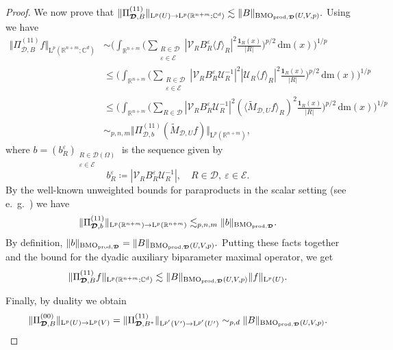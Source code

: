 \documentclass{article}
\theoremstyle{definition}
\theoremstyle{remark}
\numberwithin{equation}{section}
\newcommand{\mathdm}{\,\mathrm{dm}}
\newcommand{\cE}{\mathcal{E}}
\newcommand{\cU}{\mathcal{U}}
\newcommand{\cV}{\mathcal{V}}
\newcommand{\bfD}{\bm{\mathcal{D}}}
\newcommand{\e}{\varepsilon}
\newcommand{\reals}{\mathbb{R}}
\newcommand{\complex}{\mathbb{C}}
\newcommand{\Lp}[1]{\mathrm{L}^{#1}}
\newcommand{\1}{\mathbf{1}}
\newcommand{\BMOprodD}{\ensuremath\text{BMO}_{\text{prod},\bfD}}
\begin{document}
\begin{proof}
        We now prove that $\Vert\Pi_{\bfD,B}^{(11)}\Vert_{\Lp{p}(U)\rightarrow \Lp{p}(\reals^{n+m};\complex^d)}\lesssim\Vert B\Vert_{\BMOprodD(U,V,p)}.$ Using \cite[Lemma~5.3]{DKPS2024} we have
        \begin{align*}
            \Vert\Pi_{\bfD,B}^{(11)}f\Vert_{\Lp{p}(\reals^{n+m};\complex^d)}&\sim\bigg(\int_{\reals^{n+m}}\bigg(\sum_{\substack{R\in\bfD\\\e\in\cE}}|\cV_{R}B_{R}^{\e}\langle f\rangle_{R}|^2\frac{\1_{R}(x)}{|R|}\bigg)^{p/2}\mathdm(x)\bigg)^{1/p}\\
            &\leq\bigg(\int_{\reals^{n+m}}\bigg(\sum_{\substack{R\in\bfD\\\e\in\cE}}|\cV_{R}B_{R}^{\e}\cU_{R}^{-1}|^2|\cU_{R}\langle f\rangle_{R}|^2\frac{\1_{R}(x)}{|R|}\bigg)^{p/2}\mathdm(x)\bigg)^{1/p}\\
            &\leq\bigg(\int_{\reals^{n+m}}\bigg(\sum_{R\in\bfD}|\cV_{R}B_{R}^{\e}\cU_{R}^{-1}|^2(\langle\widetilde{M}_{\bfD,U}f\rangle_{R})^2\frac{\1_{R}(x)}{|R|}\bigg)^{p/2}\mathdm(x)\bigg)^{1/p}\\
            &\sim_{p,n,m}\Vert\Pi_{\bfD,b}^{(11)}(\widetilde{M}_{\bfD,U}f)\Vert_{\Lp{p}(\reals^{n+m})},
        \end{align*}
        where $b=(b_{R}^{\e})_{\substack{R\in\bfD(\Omega)\\\e\in\cE}}$ is the sequence given by
        \begin{equation*}
            b_{R}^{\e}\coloneq |\cV_{R}B_{R}^{\e}\cU_{R}^{-1}|,\quad R\in\bfD,~\e\in\cE.
        \end{equation*}
        By the well-known unweighted bounds for paraproducts in the scalar setting (see e.~g.~\cite{Blasco_Pott_2005}) we have
        \begin{equation*}
            \Vert\Pi_{\bfD,b}^{(11)}\Vert_{\Lp{p}(\reals^{n+m})\rightarrow \Lp{p}(\reals^{n+m})}\lesssim_{p,n,m}\Vert b\Vert_{\BMOprodD}.
        \end{equation*}
        By definition, $\Vert b\Vert_{\BMOprodD}=\Vert B\Vert_{\BMOprodD(U,V,p)}.$
        Putting these facts together and the bound for the dyadic auxiliary biparameter maximal operator, we get
        \begin{equation*}
            \Vert\Pi_{\bfD,B}^{(11)}f\Vert_{\Lp{p}(\reals^{n+m};\complex^d)} \lesssim \Vert B\Vert_{\BMOprodD(U,V,p)}\Vert f\Vert_{\Lp{p}(U)}.
        \end{equation*}

        Finally, by duality we obtain
        \begin{equation*}
            \Vert \Pi_{\bfD,B}^{(00)}\Vert_{\Lp{p}(U)\rightarrow \Lp{p}(V)}=\Vert\Pi_{\bfD,B^{\ast}}^{(11)}\Vert_{\Lp{p'}(V')\rightarrow \Lp{p'}(U')}\sim_{p,d}\Vert B\Vert_{\BMOprodD(U,V,p)}.
        \end{equation*}


\end{proof}
\end{document}
